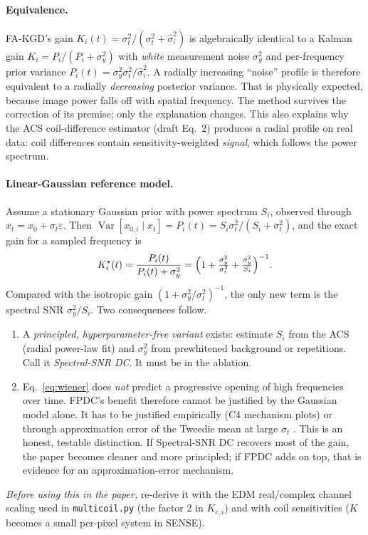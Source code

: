 \documentclass[10pt,a4paper]{article}
\newcommand{\fakgd}{FA-KGD}
\newcommand{\code}[1]{\texttt{\small #1}}
\begin{document}
\paragraph{Equivalence.} \fakgd's gain
$K_i(t)=\sigma_t^2/(\sigma_t^2+\hat\sigma_i^2)$ is algebraically identical to a Kalman
gain $K_i=P_i/(P_i+\sigma_y^2)$ with \emph{white} measurement noise $\sigma_y^2$ and
per-frequency prior variance $P_i(t)=\sigma_y^2\sigma_t^2/\hat\sigma_i^2$. A radially
increasing ``noise'' profile is therefore equivalent to a radially \emph{decreasing}
posterior variance. That is physically expected, because image power falls off with
spatial frequency. The method survives the correction of its premise; only the
explanation changes. This also explains why the ACS coil-difference estimator (draft
Eq.~2) produces a radial profile on real data: coil differences contain sensitivity-weighted
\emph{signal}, which follows the power spectrum.

\paragraph{Linear-Gaussian reference model.} Assume a stationary Gaussian prior with
power spectrum $S_i$, observed through $x_t=x_0+\sigma_t\varepsilon$. Then
$\operatorname{Var}[x_{0,i}\mid x_t]=P_i(t)=S_i\sigma_t^2/(S_i+\sigma_t^2)$, and the
exact gain for a sampled frequency is
\begin{equation}
  K_i^{\star}(t)=\frac{P_i(t)}{P_i(t)+\sigma_y^2}
  =\Bigl(1+\tfrac{\sigma_y^2}{\sigma_t^2}+\tfrac{\sigma_y^2}{S_i}\Bigr)^{-1}.
  \label{eq:wiener}
\end{equation}
Compared with the isotropic gain $(1+\sigma_y^2/\sigma_t^2)^{-1}$, the only new term is
the spectral SNR $\sigma_y^2/S_i$. Two consequences follow.
\begin{enumerate}
  \item A \emph{principled, hyperparameter-free variant} exists: estimate $S_i$ from the
        ACS (radial power-law fit) and $\sigma_y^2$ from prewhitened background or
        repetitions. Call it \emph{Spectral-SNR DC}. It must be in the ablation.
  \item Eq.~\eqref{eq:wiener} does \emph{not} predict a progressive opening of high
        frequencies over time. FPDC's benefit therefore cannot be justified by the
        Gaussian model alone. It has to be justified empirically (C4 mechanism plots) or
        through approximation error of the Tweedie mean at large $\sigma_t$
        \cite{burns2026finite}. This is an honest, testable distinction. If Spectral-SNR DC
        recovers most of the gain, the paper becomes cleaner and more principled; if FPDC
        adds on top, that is evidence for an approximation-error mechanism.
\end{enumerate}
\emph{Before using this in the paper,} re-derive it with the EDM real/complex channel
scaling used in \code{multicoil.py} (the factor 2 in $K_{c,i}$) and with coil
sensitivities ($K$ becomes a small per-pixel system in SENSE).
\end{document}
